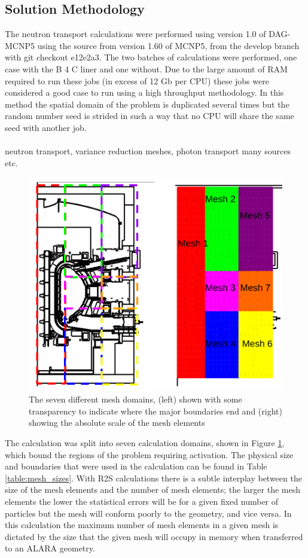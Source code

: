 \documentclass[12pt]{article}
\begin{document}
\subsection{Solution Methodology}
The neutron transport calculations were performed using version 1.0 of DAG-MCNP5
using the source from version 1.60 of MCNP5, from the develop branch with git
checkout e12e2a3. The two batches of calculations were performed, one case with
the B 4 C liner and one without. Due to the large amount of RAM required to run
these jobs (in excess of 12 Gb per CPU) these jobs were considered a good case
to run using a high throughput methodology. In this method the spatial domain
of the problem is duplicated several times but the random number seed is
strided in such a way that no CPU will share the same seed with another job.
\\
\\
neutron transport, variance reduction meshes, photon transport many sources etc.
\begin{figure}[ht!]
  \centering
  \includegraphics[scale=0.4]{../plots/transport/job_splits.png}
  \caption{The seven different mesh domains, (left) shown with some transparency
           to indicate where the major boundaries end and (right) showing the
           absolute scale of the mesh elements}
  \label{fig:mesh_domains}
\end{figure}

The calculation was split into seven calculation domains, shown in Figure
\ref{fig:mesh_domains}, which bound the regions of the problem requiring
activation. The physical size and boundaries that were used in the calculation
can be found in Table \ref{table:mesh_sizes}. With R2S calculations there is a
subtle interplay between the size of the mesh elements and the number of mesh
elements; the larger the mesh elements the lower the statistical errors will be
for a given fixed number of particles but the mesh will conform poorly to the
geometry, and vice versa. In this calculation the maximum number of mesh
elements in a given mesh is dictated by the size that the given mesh will
occupy in memory when transferred to an ALARA geometry. 
\end{document}

